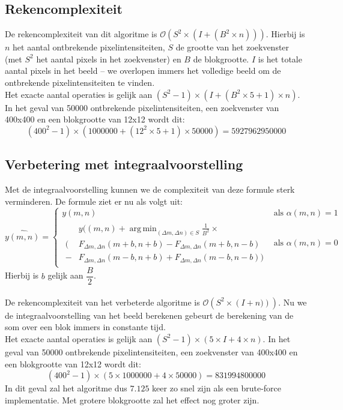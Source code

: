 \documentclass[titlepage]{article}
\DeclareMathOperator*{\argmin}{arg\,min}
\begin{document}
\subsection{Rekencomplexiteit}
De rekencomplexiteit van dit algoritme is $\mathcal{O}\left(S^2 \times \left(I + (B^2 \times n)\right)\right)$. Hierbij is $n$ het aantal ontbrekende pixelintensiteiten, $S$ de grootte van het zoekvenster (met $S^2$ het aantal pixels in het zoekvenster) en $B$ de blokgrootte. $I$ is het totale aantal pixels in het beeld -- we overlopen immers het volledige beeld om de ontbrekende pixelintensiteiten te vinden.\\
Het exacte aantal operaties is gelijk aan $(S^2-1)  \times (I + (B^2  \times 5 + 1)  \times n)$. In het geval van 50000 ontbrekende pixelintensiteiten, een zoekvenster van 400x400 en een blokgrootte van 12x12 wordt dit:
\begin{equation*}
(400^2-1)  \times (1000000 + (12^2  \times 5 + 1) \times 50000) = 5927962950000
\end{equation*}

\subsection{Verbetering met integraalvoorstelling} \label{integraalvoorstelling}
Met de integraalvoorstelling kunnen we de complexiteit van deze formule sterk verminderen. De formule ziet er nu als volgt uit:
\begin{equation*} \widehat{y(m,n)} = \begin{cases}
	y(m,n)
    	& \text{als $\alpha(m,n) = 1$}  \\
	\begin{aligned} 
	& y((m,n) + \argmin_{(\Delta m, \Delta n) \in S} \frac{1}{B^2} \times \\
    \Big( & F_{\Delta m,\Delta n}(m+b,n+b) - F_{\Delta m,\Delta n}(m+b,n-b) \\
    - & F_{\Delta m,\Delta n}(m-b,n+b) + F_{\Delta m,\Delta n}(m-b,n-b) \Big)
    \end{aligned}
    	& \text{als $\alpha(m,n) = 0$}
   \end{cases}
\end{equation*}
Hierbij is $b$ gelijk aan $\dfrac{B}{2}$. \\ \\

De rekencomplexiteit van het verbeterde algoritme is $\mathcal{O}\left(S^2 \times \left(I + n)\right)\right)$. Nu we de integraalvoorstelling van het beeld berekenen gebeurt de berekening van de som over een blok immers in constante tijd.\\
Het exacte aantal operaties is gelijk aan $(S^2-1)  \times (5 \times I + 4 \times n)$. In het geval van 50000 ontbrekende pixelintensiteiten, een zoekvenster van 400x400 en een blokgrootte van 12x12 wordt dit:
\begin{equation*}
(400^2-1)  \times (5 \times 1000000 + 4 \times 50000) = 831994800000
\end{equation*}
In dit geval zal het algoritme dus $7.125$ keer zo snel zijn als een brute-force implementatie. Met grotere blokgrootte zal het effect nog groter zijn.
\end{document}
